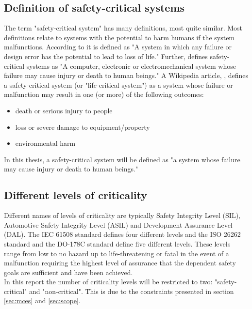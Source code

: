 \subsection{Definition of safety-critical systems}
The term "safety-critical system" has many definitions, most quite similar. Most definitions relate to systems with the potential to harm humans if the system malfunctions. According to \cite{website:encyclopedia} it is defined as "A system in which any failure or design error has the potential to lead to loss of life." Further, \cite{website:dictionary} defines safety-critical systems as "A computer, electronic or electromechanical system whose failure may cause injury or death to human beings." A Wikipedia article, \cite{website:wikipedia}, defines a safety-critical system (or "life-critical system") as a system whose failure or malfunction may result in one (or more) of the following outcomes:
\begin{itemize}
\item death or serious injury to people
\item loss or severe damage to equipment/property
\item environmental harm
\end{itemize}
In this thesis, a safety-critical system will be defined as "a system whose failure may cause injury or death to human beings."

\subsection{Different levels of criticality}
Different names of levels of criticality are typically Safety Integrity Level (SIL), Automotive Safety Integrity Level (ASIL) and Development Assurance Level (DAL). The IEC 61508 standard \cite{IEC61508} defines four different levels and the ISO 26262 standard \cite{ISO26262} and the DO-178C standard \cite{DO178C} define five different levels. These levels range from low to no hazard up to life-threatening or fatal in the event of a malfunction requiring the highest level of assurance that the dependent safety goals are sufficient and have been achieved.\\

In this report the number of criticality levels will be restricted to two: "safety-critical" and "non-critical". This is due to the constraints presented in section \ref{sec:mces} and \ref{sec:scope}.


